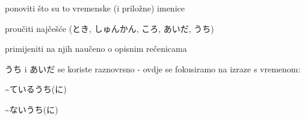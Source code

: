 
\author{Tomislav Mamić}

	
	
	\begin{hyou}
		\item ponoviti što su to vremenske (i priložne) imenice
		\item proučiti najčešće (とき, しゅんかん, ころ, あいだ, うち)
		\item primijeniti na njih naučeno o opisnim rečenicama
	\end{hyou}

	
	うち i あいだ se koriste raznovrsno - ovdje se fokusiramo na izraze s vremenom:
	
	\begin{hyou}
		\item \textasciitilde ているうち(に)
		\item \textasciitilde ないうち(に)
	\end{hyou}

